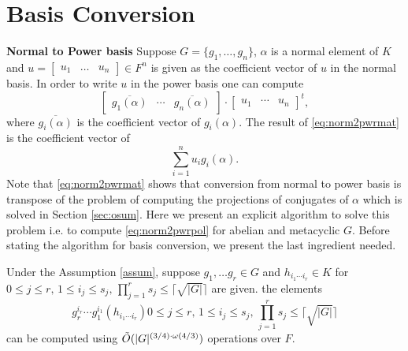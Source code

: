 \section{Basis Conversion}

\textbf{Normal to Power basis}
Suppose $G = \lbrace g_1, \ldots, g_n \rbrace$, $\alpha$ is a normal element of $K$ and $u = \begin{bmatrix}u_1 & \ldots & u_n \end{bmatrix} \in F^n$ is given as the coefficient vector of $u$ in the normal basis.
In order to write $u $ in the power basis one can compute 
\begin{equation}\label{eq:norm2pwrmat}
\left[\begin{array}{c|c|c}
\overline{g_1(\alpha)} & \cdots & \overline{g_n(\alpha)} 
\end{array}\right]\cdot 
\begin{bmatrix}
u_1 & \cdots & u_n
\end{bmatrix}^t,
\end{equation}
where $\overline{g_i(\alpha)}$ is the coefficient vector of $g_i(\alpha)$. The result of \eqref{eq:norm2pwrmat} is the coefficient vector of
\begin{equation}\label{eq:norm2pwrpol}
\sum_{i = 1}^n u_i g_i(\alpha).
\end{equation}
Note that \eqref{eq:norm2pwrmat} shows that conversion from normal to power basis is transpose of the problem of computing the projections of 
conjugates of $\alpha$ which is solved in Section \ref{sec:osum}. Here we present an explicit algorithm to solve this problem i.e. to compute
\eqref{eq:norm2pwrpol} for abelian and metacyclic $G$. Before stating the algorithm for basis conversion, we present the last
ingredient needed. 

\begin{lemma}\label{lem:hornerrep}
Under the Assumption \ref{assum}, suppose $g_1, \ldots g_r \in G$ and $h_{i_1 \cdots i_r} \in K$ for $0 \leq j \leq r, \, 
1 \leq i_j \leq s_j, \, \prod_{j = 1}^r s_j \leq  \lceil \sqrt{\vert G \vert} \rceil $ are given. the elements 
$$g_r^{i_r}\cdots g_1^{i_1}(h_{i_1 \cdots i_r}) 0 \leq j \leq r, \, 
1 \leq i_j \leq s_j, \, \prod_{j = 1}^r s_j \leq  \lceil \sqrt{\vert G \vert} \rceil $$
can be computed using $\tilde{O}(\vert G \vert ^{(3/4)\cdot \omega(4/3)})$ operations over $F$.
\end{lemma}

